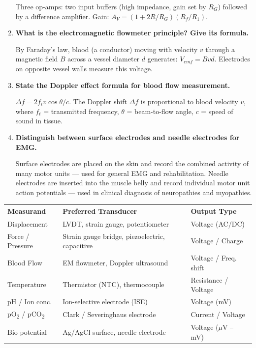 \documentclass[12pt,a4paper]{article}
\newcommand{\Q}[1]{\textbf{#1}\par\noindent\ignorespaces}
\renewcommand{\arraystretch}{1.45}
\begin{document}
\begin{tcolorbox}[exambox, title={\textbf{Frequently Asked / Viva Questions}}]
\begin{enumerate}[topsep=0pt, label=\textbf{Q\arabic*.}, itemsep=5pt]
    Three op-amps: two input buffers (high impedance, gain set by $R_G$) followed by a difference amplifier. Gain: $A_V = (1 + 2R/R_G)(R_f/R_1)$.
  \item \Q{What is the electromagnetic flowmeter principle? Give its formula.}
    By Faraday's law, blood (a conductor) moving with velocity $v$ through a magnetic field $B$ across a vessel diameter $d$ generates: $V_{emf} = Bvd$. Electrodes on opposite vessel walls measure this voltage.
  \item \Q{State the Doppler effect formula for blood flow measurement.}
    $\Delta f = 2 f_t v \cos\theta / c$. The Doppler shift $\Delta f$ is proportional to blood velocity $v$, where $f_t$ = transmitted frequency, $\theta$ = beam-to-flow angle, $c$ = speed of sound in tissue.
  \item \Q{Distinguish between surface electrodes and needle electrodes for EMG.}
    Surface electrodes are placed on the skin and record the combined activity of many motor units --- used for general EMG and rehabilitation. Needle electrodes are inserted into the muscle belly and record individual motor unit action potentials --- used in clinical diagnosis of neuropathies and myopathies.
\end{enumerate}
\end{tcolorbox}

\begin{tcolorbox}[tikzbox, title={Transducer Classification Summary}]
\renewcommand{\arraystretch}{1.4}
\par\noindent
\begin{tabularx}{\linewidth}{|B{2.8cm}|Y|Y|}
\hline
\textbf{Measurand} & \textbf{\color{myteal}Preferred Transducer} & \textbf{\color{myamber}Output Type} \\
\hline
Displacement & LVDT, strain gauge, potentiometer & Voltage (AC/DC) \\
\hline
Force / Pressure & Strain gauge bridge, piezoelectric, capacitive & Voltage / Charge \\
\hline
Blood Flow & EM flowmeter, Doppler ultrasound & Voltage / Freq. shift \\
\hline
Temperature & Thermistor (NTC), thermocouple & Resistance / Voltage \\
\hline
pH / Ion conc. & Ion-selective electrode (ISE) & Voltage (mV) \\
\hline
pO\textsubscript{2} / pCO\textsubscript{2} & Clark / Severinghaus electrode & Current / Voltage \\
\hline
Bio-potential & Ag/AgCl surface, needle electrode & Voltage ($\mu$V -- mV) \\
\hline
\end{tabularx}
\end{tcolorbox}
\end{document}
